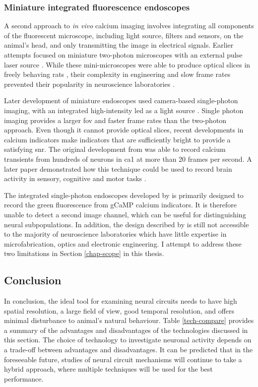 \subsubsection{Miniature integrated fluorescence endoscopes}
A second approach to \textit{in vivo} calcium imaging involves integrating all components of the fluorescent microscope, including light source, filters and sensors, on the animal's head, and only transmitting the image in electrical signals. Earlier attempts focused on miniature two-photon microscopes with an external pulse laser source \citep{flusberg05, piyawattanametha09}. While these mini-microscopes were able to produce optical slices in freely behaving rats \citep{sawinski09}, their complexity in engineering and slow frame rates prevented their popularity in neuroscience laboratories \citep{hamel15, yang17}.

Later development of miniature endoscopes used camera-based single-photon imaging, with an integrated high-intensity \gls{led} as a light source \citep{ghosh11}. Single photon imaging provides a larger \gls{fov} and faster frame rates than the two-photon approach. Even though it cannot provide optical slices, recent developments in calcium indicators make indicators that are sufficiently bright to provide a satisfying \gls{snr}. The original development from \citet{ghosh11} was able to record calcium transients from hundreds of neurons in \gls{ca1} at more than 20 frames per second. A later paper demonstrated how this technique could be used to record brain activity in sensory, cognitive and motor tasks \citep{ziv13}.

The integrated single-photon endoscopes developed by \citet{ghosh11} is primarily designed to record the green fluorescence from gCaMP calcium indicators. It is therefore unable to detect a second image channel, which can be useful for distinguishing neural subpopulations. In addition, the design described by \citet{ghosh11} is still not accessible to the majority of neuroscience laboratories which have little expertise in microfabrication, optics and electronic engineering. I attempt to address these two limitations in Section \ref{chap-scope} in this thesis. 

\subsection{Conclusion}

In conclusion, the ideal tool for examining neural circuits needs to have high spatial resolution, a large field of view, good temporal resolution, and offers minimal disturbance to animal's natural behaviour. Table \ref{tech-compare} provides a summary of the advantages and disadvantages of the technologies discussed in this section. The choice of technology to investigate neuronal activity depends on a trade-off between advantages and disadvantages. It can be predicted that in the foreseeable future, studies of neural circuit mechanisms will continue to take a hybrid approach, where multiple techniques will be used for the best performance. 

